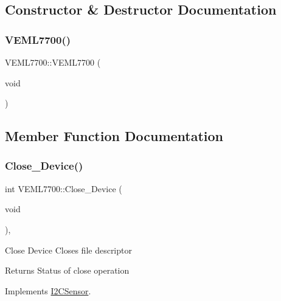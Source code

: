 \subsection{Constructor \& Destructor Documentation}
\mbox{\label{classVEML7700_a6b351807d27da4e07ea3bb93bd3dcbb1}} 
\subsubsection{\texorpdfstring{V\+E\+M\+L7700()}{VEML7700()}}
{\footnotesize\ttfamily V\+E\+M\+L7700\+::\+V\+E\+M\+L7700 (\begin{DoxyParamCaption}\item[{void}]{ }\end{DoxyParamCaption})\hspace{0.3cm}{\ttfamily [inline]}}



\subsection{Member Function Documentation}
\mbox{\label{classVEML7700_af4be747d3c60af76ca46c7e4fb859ec7}} 
\subsubsection{\texorpdfstring{Close\+\_\+\+Device()}{Close\_Device()}}
{\footnotesize\ttfamily int V\+E\+M\+L7700\+::\+Close\+\_\+\+Device (\begin{DoxyParamCaption}\item[{void}]{ }\end{DoxyParamCaption})\hspace{0.3cm}{\ttfamily [override]}, {\ttfamily [virtual]}}

Close Device Closes file descriptor

\begin{DoxyReturn}{Returns}
Status of close operation 
\end{DoxyReturn}


Implements \hyperlink{classI2CSensor_acee1633439e97bae412441ac085fabba}{I2\+C\+Sensor}.

